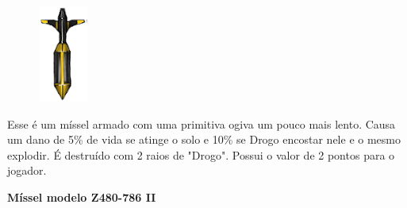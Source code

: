 \documentclass[a4paper,11pt]{article}
\begin{document}
\begin{minipage}{\textwidth}
	\begin{figure}
		\vspace{-\baselineskip}
		\includegraphics[width=0.6\linewidth]{imagens/pi-Misseis2.png} 
	\end{figure}
	Esse é um míssel armado com uma primitiva ogiva um pouco mais lento. Causa um dano de 5\% de vida se atinge o solo e 10\% se Drogo encostar nele e o mesmo explodir. É destruído com 2 raios de "Drogo". Possui o valor de 2 pontos para o jogador.
	\vspace{30pt}
\end{minipage}
	
\textbf{Míssel modelo Z480-786 II}
\end{document}

